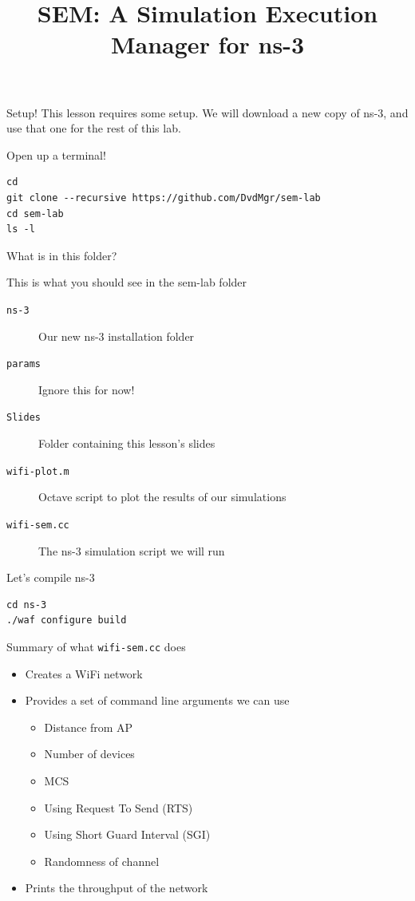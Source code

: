 \documentclass[presentation]{beamer}
\date{}
\title{SEM: A Simulation Execution Manager for ns-3}
\begin{document}
\maketitle


\begin{frame}[label={sec:org430bc56},fragile]{Setup!}
 This lesson requires some setup. We will download a new copy of ns-3, and use
that one for the rest of this lab.

\begin{block}{Open up a terminal!}
\begin{verbatim}
cd
git clone --recursive https://github.com/DvdMgr/sem-lab
cd sem-lab
ls -l
\end{verbatim}
\end{block}
\end{frame}

\begin{frame}[label={sec:orgde3c64d},fragile]{What is in this folder?}
 \begin{block}{This is what you should see in the sem-lab folder}
\begin{description}
\item[{\texttt{ns-3}}] Our new ns-3 installation folder
\item[{\texttt{params}}] Ignore this for now!
\item[{\texttt{Slides}}] Folder containing this lesson's slides
\item[{\texttt{wifi-plot.m}}] Octave script to plot the results of our simulations
\item[{\texttt{wifi-sem.cc}}] The ns-3 simulation script we will run
\end{description}
\end{block}

\begin{block}{Let's compile ns-3}
\begin{verbatim}
cd ns-3
./waf configure build
\end{verbatim}
\end{block}
\end{frame}

\begin{frame}[label={sec:org60479b9},fragile]{Summary of what \texttt{wifi-sem.cc} does}
 \begin{itemize}
\item Creates a WiFi network
\item Provides a set of command line arguments we can use
\begin{itemize}
\item Distance from AP
\item Number of devices
\item MCS
\item Using Request To Send (RTS)
\item Using Short Guard Interval (SGI)
\item Randomness of channel
\end{itemize}
\item Prints the throughput of the network
\end{itemize}
\end{frame}
\end{document}

